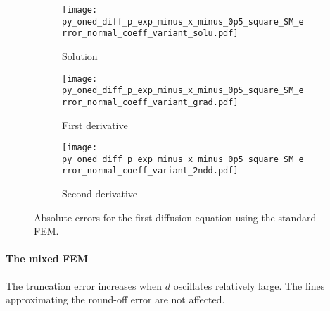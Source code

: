 \documentclass[review,3p]{elsarticle}
\begin{document}
\begin{figure}[!ht]
    \begin{subfigure}{5.5cm}
        \texttt{[image: py\_oned\_diff\_p\_exp\_minus\_x\_minus\_0p5\_square\_SM\_error\_normal\_coeff\_variant\_solu.pdf]}
        \caption{Solution}
        \label{py_oned_diff_p_exp_minus_x_minus_0p5_square_SM_error_normal_coeff_variant_solu}
    \end{subfigure}
    \hspace{-0.2cm}
    \begin{subfigure}{5.5cm}
        \texttt{[image: py\_oned\_diff\_p\_exp\_minus\_x\_minus\_0p5\_square\_SM\_error\_normal\_coeff\_variant\_grad.pdf]}
        \caption{First derivative}
        \label{py_oned_diff_p_exp_minus_x_minus_0p5_square_SM_error_normal_coeff_variant_grad}
    \end{subfigure}
    \hspace{-0.2cm}
    \begin{subfigure}{5.5cm}
        \texttt{[image: py\_oned\_diff\_p\_exp\_minus\_x\_minus\_0p5\_square\_SM\_error\_normal\_coeff\_variant\_2ndd.pdf]}
        \caption{Second derivative}
        \label{py_oned_diff_p_exp_minus_x_minus_0p5_square_SM_error_normal_coeff_variant_2ndd}
    \end{subfigure}
\caption{Absolute errors for the first diffusion equation using the standard FEM.}
\label{py_oned_diff_p_exp_minus_x_minus_0p5_square_SM_error_normal_coeff_variant}
\end{figure}

\newpage
\paragraph{The mixed FEM}

The truncation error increases when $d$ oscillates relatively large.
The lines approximating the round-off error are not affected.
\end{document}
